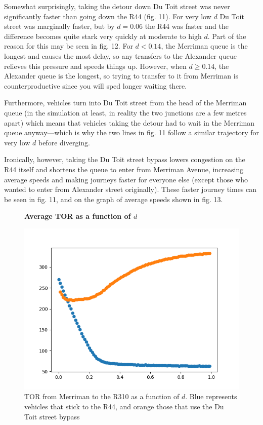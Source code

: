 \documentclass{article}
\begin{document}
Somewhat surprisingly, taking the detour down Du Toit street was never significantly faster than going down the R44 (fig. 11). For very low $d$ Du Toit street was marginally faster, but by $d = 0.06$ the R44 was faster and the difference becomes quite stark very quickly at moderate to high $d$. Part of the reason for this may be seen in fig. 12. For $d < 0.14$, the Merriman queue is the longest and causes the most delay, so any transfers to the Alexander queue relieves this pressure and speeds things up. However, when $d \geq 0.14$, the Alexander queue is the longest, so trying to transfer to it from Merriman is counterproductive since you will sped longer waiting there.

Furthermore, vehicles turn into Du Toit street from the head of the Merriman queue (in the simulation at least, in reality the two junctions are a few metres apart) which means that vehicles taking the detour had to wait in the Merriman queue anyway---which is why the two lines in fig. 11 follow a similar trajectory for very low $d$ before diverging.

Ironically, however, taking the Du Toit street bypass lowers congestion on the R44 itself and shortens the queue to enter from Merriman Avenue, increasing average speeds and making journeys faster for everyone else (except those who wanted to enter from Alexander street originally). These faster journey times can be seen in fig. 11, and on the graph of average speeds shown in fig. 13.

\begin{figure}
\textbf{\large Average TOR as a function of $d$}\par\medskip
{}
\includegraphics[scale = 0.55, left]{./data/phase4/TORs_vs_d.png}
\vspace*{0.1cm}\hspace*{4.5cm}{\large $d$}
\caption{\label{fig} TOR from Merriman to the R310 as a function of $d$. Blue represents vehicles that stick to the R44, and orange those that use the Du Toit street bypass}
\end{figure}
\end{document}
